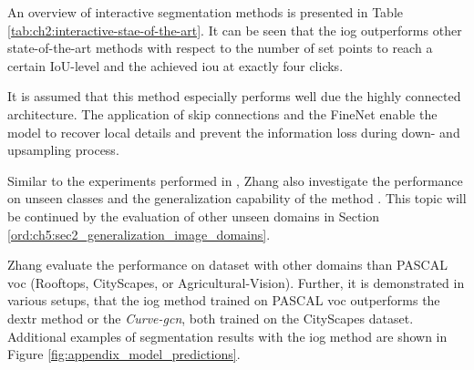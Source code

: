 An overview of interactive segmentation methods is presented in Table \ref{tab:ch2:interactive-stae-of-the-art}.
It can be seen that the \gls{iog} outperforms other state-of-the-art methods with respect to the number of set points to reach a certain IoU-level and the achieved \gls{iou} at exactly four clicks.

It is assumed that this method especially performs well due the highly connected architecture.
The application of skip connections and the FineNet enable the model to recover local details and prevent the information loss during down- and upsampling process.

Similar to the experiments performed in \cite{Man18-DEXTR}, Zhang \etal also investigate the performance on unseen classes and the generalization capability of the method \Cite{Zha20-IOG}. 
This topic will be continued by the evaluation of other unseen domains in Section \ref{ord:ch5:sec2_generalization_image_domains}.

Zhang \etal evaluate the performance on dataset with other domains than PASCAL \gls{voc} (\eg Rooftops, CityScapes, or Agricultural-Vision).
Further, it is demonstrated in various setups, that the \gls{iog} method trained on PASCAL \gls{voc} outperforms the \gls{dextr} method or the \textit{Curve-\gls{gcn}}, both trained on the CityScapes dataset.
Additional examples of segmentation results with the \gls{iog} method are shown in Figure \ref{fig:appendix_model_predictions}.